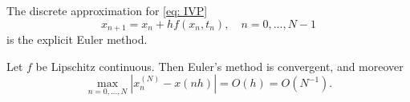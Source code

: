 \begin{definition}
\label{def: Explicit Euler}
The discrete approximation for \eqref{eq: IVP} 
\begin{equation}
\label{eq: Explicit Euler}
x_{n+1} = x_n + h f(x_n, t_n),\quad n=0,\ldots ,N-1
\end{equation}
is the explicit Euler method. 
\end{definition}



\begin{theorem}
\label{thm: First order convergence of Euler}
Let $f$ be Lipschitz continuous. Then Euler's method is convergent, and moreover $$\max _{n=0, \ldots, N}\left|x_n^{(N)}-x(n h)\right|=O(h)=O\left(N^{-1}\right).$$
\end{theorem}
